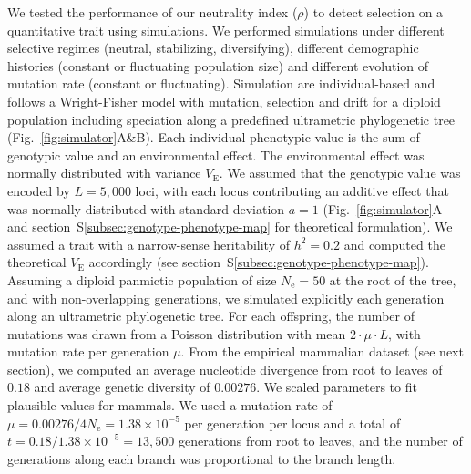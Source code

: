 \documentclass{article}
\newcommand{\Multiply}{\cdot}
\newcommand{\Ne}{N_{\text{e}}}
\newcommand{\Time}{t}
\newcommand{\Heritability}{h^2}
\newcommand{\MutationRate}{\mu}
\newcommand{\NbrLoci}{L}
\newcommand{\VarEnv}{V_{\mathrm{E}}}
\newcommand{\NI}{\rho}
\begin{document}
We tested the performance of our neutrality index ($\NI$) to detect selection on a quantitative trait using simulations.
We performed simulations under different selective regimes (neutral, stabilizing, diversifying), different demographic histories (constant or fluctuating population size) and different evolution of mutation rate (constant or fluctuating).
Simulation are individual-based and follows a Wright-Fisher model with mutation, selection and drift for a diploid population including speciation along a predefined ultrametric phylogenetic tree (Fig.~\ref{fig:simulator}A\&B).
Each individual phenotypic value is the sum of genotypic value and an environmental effect.
The environmental effect was normally distributed with variance $\VarEnv$.
We assumed that the genotypic value was encoded by $\NbrLoci=5,000$ loci, with each locus contributing an additive effect that was normally distributed with standard deviation $a=1$ (Fig.~\ref{fig:simulator}A and section~S\ref{subsec:genotype-phenotype-map} for theoretical formulation).
We assumed a trait with a narrow-sense heritability of $\Heritability=0.2$ and computed the theoretical $\VarEnv$ accordingly (see section~S\ref{subsec:genotype-phenotype-map}).
Assuming a diploid panmictic population of size $\Ne=50$ at the root of the tree, and with non-overlapping generations, we simulated explicitly each generation along an ultrametric phylogenetic tree.
For each offspring, the number of mutations was drawn from a Poisson distribution with mean $2 \Multiply \MutationRate \Multiply \NbrLoci $, with mutation rate per generation $\MutationRate$.
From the empirical mammalian dataset (see next section), we computed an average nucleotide divergence from root to leaves of $0.18$ and average genetic diversity of $0.00276$.
We scaled parameters to fit plausible values for mammals.
We used a mutation rate of $\MutationRate=0.00276 / 4 \Ne = 1.38 \times 10^{-5}$ per generation per locus and a total of $\Time = 0.18 / 1.38 \times 10^{-5} = 13,500$ generations from root to leaves, and the number of generations along each branch was proportional to the branch length.
\end{document}
